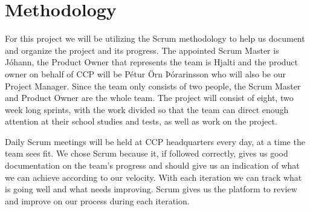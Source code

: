 \section{Methodology}\label{methodology}
For this project we will be utilizing the Scrum methodology to help us document and organize the project and its progress. The appointed Scrum Master is Jóhann, the Product Owner that represents the team is Hjalti and the product owner on behalf of CCP will be Pétur Örn Þórarinsson who will also be our Project Manager. Since the team only consists of two people, the Scrum Master and Product Owner are the whole team. The project will consist of eight, two week long sprints, with the work divided so that the team can direct enough attention at their school studies and tests, as well as work on the project.

Daily Scrum meetings will be held at CCP headquarters every day, at a time the team sees fit. We chose Scrum because it, if followed correctly, gives us good documentation on the team's progress and should give us an indication of what we can achieve according to our velocity. With each iteration we can track what is going well and what needs improving. Scrum gives us the platform to review and improve on our process during each iteration.